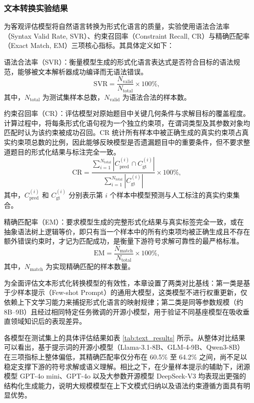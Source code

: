 \subsubsection{文本转换实验结果}

为客观评估模型将自然语言转换为形式化语言的质量，实验使用语法合法率（Syntax Valid Rate, SVR）、约束召回率（Constraint Recall, CR）与精确匹配率（Exact Match, EM）三项核心指标。其具体定义如下：

语法合法率（SVR）：衡量模型生成的形式化语言表达式是否符合目标的语法规范，能够被文本解析器\cite{lu2021intergps}成功编译而无语法错误。
\begin{equation}
  \mathrm{SVR} = \frac{N_{\mathrm{valid}}}{N_{\mathrm{total}}} \times 100\%,
\end{equation}
其中，$N_{\mathrm{total}}$ 为测试集样本总数，$N_{\mathrm{valid}}$ 为语法合法的样本数。

约束召回率（CR）：评估模型对原始题目中关键几何条件与求解目标的覆盖程度。计算过程中，将每条形式化语句视为一个独立约束项，在谓词类型及其参数对象均匹配时认为该约束被成功召回。CR 统计所有样本中被正确生成的真实约束项占真实约束项总数的比例，因此能够反映模型是否遗漏题目中的重要条件，但不要求整道题目的形式化结果与标注完全一致。
\begin{equation}
  \mathrm{CR} = \frac{\sum_{i=1}^{N_{\mathrm{total}}} |C_{\mathrm{pred}}^{(i)} \cap C_{\mathrm{gt}}^{(i)}|}{\sum_{i=1}^{N_{\mathrm{total}}} |C_{\mathrm{gt}}^{(i)}|} \times 100\%,
\end{equation}
其中，$C_{\mathrm{pred}}^{(i)}$ 和 $C_{\mathrm{gt}}^{(i)}$ 分别表示第 $i$ 个样本中模型预测与人工标注的真实约束集合。

精确匹配率（EM）：要求模型生成的完整形式化结果与真实标签完全一致，或在抽象语法树上逻辑等价，即只有当一个样本中的所有约束项均被正确生成且不存在额外错误约束时，才记为匹配成功，是衡量下游符号求解可靠性的最严格标准。
\begin{equation}
  \mathrm{EM} = \frac{N_{\mathrm{match}}}{N_{\mathrm{total}}} \times 100\%,
\end{equation}
其中，$N_{\mathrm{match}}$ 为实现精确匹配的样本数量。

为全面评估文本形式化转换模型的有效性，本章设置了两类对比基线：第一类是基于少样本提示（Few-shot Prompt）的通用大模型，这类模型不进行权重更新，仅依赖上下文学习能力来捕捉形式化语言的映射规律；第二类是同等参数规模（约 8B--9B）且经过相同特定任务微调的开源小模型，用于验证不同基座模型在吸收垂直领域知识后的表现差异。

各模型在测试集上的具体评估结果如表 \ref{tab:text_results} 所示。从整体对比结果可以看出，基于提示词的开源小模型（Llama-3.1-8B、GLM-4-9B、Qwen3-8B）在三项指标上整体偏低，其精确匹配率仅分布在 60.5\% 至 64.2\% 之间，尚不足以稳定支撑下游的符号求解或语义理解。相比之下，在少量样本提示的辅助下，闭源模型 GPT-4o mini、GPT-4o 以及大参数开源模型 DeepSeek-V3 均表现出更强的结构化生成能力，说明大规模模型在上下文模式归纳以及语法约束遵循方面具有明显优势。

